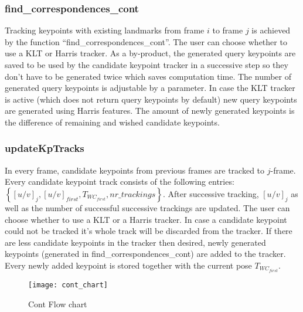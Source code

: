 \subsubsection{find\_correspondences\_cont}
Tracking keypoints with existing landmarks from frame $i$ to frame $j$ is achieved by the function ``find\_correspondences\_cont''. The user can choose whether to use a KLT or Harris tracker. As a by-product, the generated query keypoints are saved to be used by the candidate keypoint tracker in a successive step so they don't have to be generated twice which saves computation time. The number of generated query keypoints is adjustable by a parameter. In case the KLT tracker is active (which does not return query keypoints by default) new query keypoints are generated using Harris features. The amount of newly generated keypoints is the difference of remaining and wished candidate keypoints.

\subsubsection{updateKpTracks}
In every frame, candidate keypoints from previous frames are tracked to $j$-frame. Every candidate keypoint track consists of the following entries: $\left\{\left[u/v\right]_j, \left[u/v\right]_{first}, T_{WC_{first}}, nr\_trackings\right\}$. After successive tracking, $[u/v]_j$ as well as the number of successful successive trackings are updated. The user can choose whether to use a KLT or a Harris tracker.
In case a candidate keypoint could not be tracked it's whole track will be discarded from the tracker. If there are less candidate keypoints in the tracker then desired, newly generated keypoints (generated in find\_correspondences\_cont) are added to the tracker. Every newly added keypoint is stored together with the current pose $T_{WC_{first}}$.


\begin{figure}[ht]
	\centering
	\texttt{[image: cont\_chart]}
	\caption{Cont Flow chart}
	\label{img_flow_cont}
\end{figure}